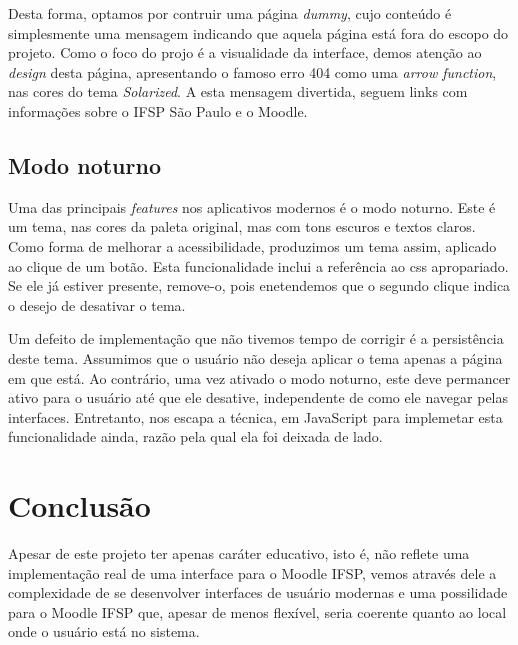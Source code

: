 \documentclass[11pt]{article}
\begin{document}
Desta forma, optamos por contruir uma página \emph{dummy}, cujo conteúdo é
simplesmente uma mensagem indicando que aquela página está fora do
escopo do projeto.
Como o foco do projo é a visualidade da interface, demos atenção
ao \emph{design} desta página, apresentando o famoso erro 404 como uma
\emph{arrow function}, nas cores do tema \emph{Solarized}.
A esta mensagem divertida, seguem links com informações sobre o IFSP
São Paulo e o Moodle.

\subsection*{Modo noturno}
\label{sec:orgd111e76}
Uma das principais \emph{features} nos aplicativos modernos é o modo
noturno. Este é um tema, nas cores da paleta original, mas com tons
escuros e textos claros.
Como forma de melhorar a acessibilidade, produzimos um tema assim,
aplicado ao clique de um botão. Esta funcionalidade inclui a
referência ao css apropariado. Se ele já estiver presente, remove-o,
pois enetendemos que o segundo clique indica o desejo de desativar o
tema.

Um defeito de implementação que não tivemos tempo de corrigir é a
persistência deste tema. Assumimos que o usuário não deseja aplicar o
tema apenas a página em que está. Ao contrário, uma vez ativado o modo
noturno, este deve permancer ativo para o usuário até que ele
desative, independente de como ele navegar pelas interfaces.
Entretanto, nos escapa a técnica, em JavaScript para implemetar esta
funcionalidade ainda, razão pela qual ela foi deixada de lado.



\section*{Conclusão}
\label{sec:org408824f}
Apesar de este projeto ter apenas caráter educativo, isto é, não
reflete uma implementação real de uma interface para o Moodle IFSP,
vemos através dele a complexidade de se desenvolver interfaces de
usuário modernas e uma possilidade para o Moodle IFSP que, apesar de
menos flexível, seria coerente quanto ao local onde o usuário está no
sistema.
\end{document}
